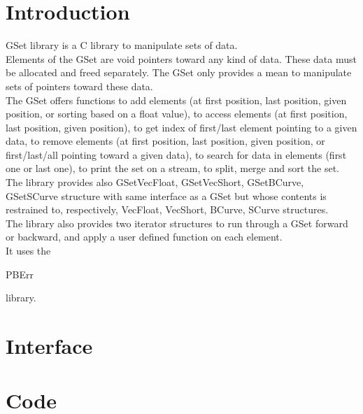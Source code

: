 \section*{Introduction}

GSet library is a C library to manipulate sets of data.\\

Elements of the GSet are void pointers toward any kind of data. These data must be allocated and freed separately. The GSet only provides a mean to manipulate sets of pointers toward these data.\\

The GSet offers functions to add elements (at first position, last position, given position, or sorting based on a float value), to access elements (at first position, last position, given position), to get index of first/last element pointing to a given data, to remove elements (at first position, last position, given position, or first/last/all pointing toward a given data), to search for data in elements (first one or last one), to print the set on a stream, to split, merge and sort the set.\\

The library provides also GSetVecFloat, GSetVecShort, GSetBCurve, GSetSCurve structure with same interface as a GSet but whose contents is restrained to, respectively, VecFloat, VecShort, BCurve, SCurve structures.\\

The library also provides two iterator structures to run through a GSet forward or backward, and apply a user defined function on each element.\\ 

It uses the \begin{ttfamily}PBErr\end{ttfamily} library.\\

\section{Interface}

\begin{scriptsize}
\begin{ttfamily}

\end{ttfamily}
\end{scriptsize}

\section{Code}

